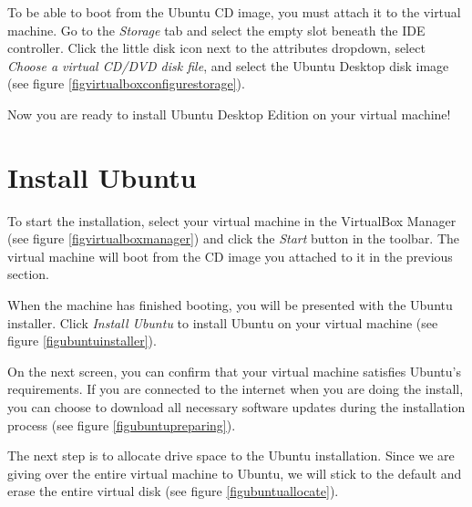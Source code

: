 \documentclass[ebook,10pt,twoside,openright]{memoir}
\begin{document}

To be able to boot from the Ubuntu CD image, you must attach it to the virtual machine. Go to the \emph{Storage} tab and select the empty slot beneath the IDE controller. Click the little disk icon next to the attributes dropdown, select \emph{Choose a virtual CD/DVD disk file}, and select the Ubuntu Desktop disk image (see figure \ref{figvirtualboxconfigurestorage}).


Now you are ready to install Ubuntu Desktop Edition on your virtual machine!


\section{Install Ubuntu} \label{secinstallubuntu}

To start the installation, select your virtual machine in the VirtualBox Manager (see figure \ref{figvirtualboxmanager}) and click the \emph{Start} button in the toolbar. The virtual machine will boot from the CD image you attached to it in the previous section.


When the machine has finished booting, you will be presented with the Ubuntu installer. Click \emph{Install Ubuntu} to install Ubuntu on your virtual machine (see figure \ref{figubuntuinstaller}).


On the next screen, you can confirm that your virtual machine satisfies Ubuntu's requirements. If you are connected to the internet when you are doing the install, you can choose to download all necessary software updates during the installation process (see figure \ref{figubuntupreparing}).


The next step is to allocate drive space to the Ubuntu installation. Since we are giving over the entire virtual machine to Ubuntu, we will stick to the default and erase the entire virtual disk (see figure \ref{figubuntuallocate}).
\end{document}
